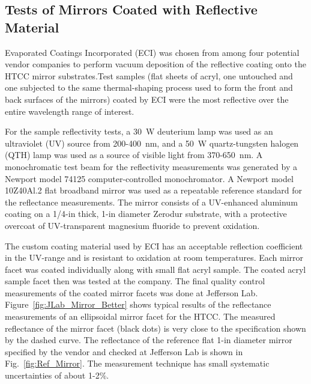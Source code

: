 \subsection{Tests of Mirrors Coated with Reflective Material}

Evaporated Coatings Incorporated (ECI) was chosen from among four potential vendor companies to perform
vacuum deposition of the reflective coating onto the HTCC mirror substrates.Test samples (flat sheets of acryl,
one untouched and one subjected to the same thermal-shaping process used to form the front and back surfaces
of the mirrors) coated by ECI were the most reflective over the entire wavelength range of interest.

For the sample reflectivity tests, a 30~W deuterium lamp was used as an ultraviolet (UV) source from
200-400~nm, and a 50~W quartz-tungsten halogen (QTH) lamp was used as a source of visible light from
370-650~nm. A monochromatic test beam for the reflectivity measurements was generated by a Newport
model 74125 computer-controlled monochromator. A Newport model 10Z40Al.2 flat broadband mirror was
used as a repeatable reference standard for the reflectance measurements. The mirror consists of a
UV-enhanced aluminum coating on a 1/4-in thick, 1-in diameter Zerodur substrate, with a protective overcoat
of UV-transparent magnesium fluoride to prevent oxidation.

The custom coating material used by ECI has an acceptable reflection coefficient in the UV-range and is
resistant to oxidation at room temperatures. Each mirror facet was coated individually along with small flat
acryl sample. The coated acryl sample facet then was tested at the company. The final quality control
measurements of the coated mirror facets was done at Jefferson Lab. Figure~\ref{fig:JLab_Mirror_Better}
shows typical results of the reflectance  measurements of an ellipsoidal mirror facet for the HTCC. The
measured reflectance of the mirror facet (black dots) is very close to the specification shown by the dashed
curve. The reflectance of the reference flat 1-in diameter mirror specified by the vendor and checked at
Jefferson Lab is shown in Fig.~\ref{fig:Ref_Mirror}. The measurement technique has small systematic
uncertainties of about 1-2\%.

